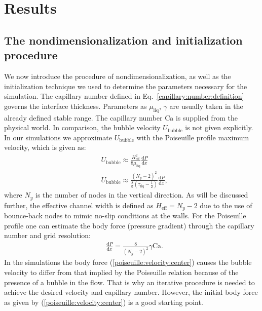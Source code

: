 \documentclass[preprint,12pt]{elsarticle}
\newcommand{\Ca}{\mathrm{Ca}}
\begin{document}
\section{Results}
\subsection{The nondimensionalization and initialization procedure}
\label{section:init}
We now introduce the procedure of nondimensionalization, as well as
the initialization technique we used to determine the parameters necessary for
the simulation. The capillary number defined in Eq.~\ref{capillary:number:definition} governs the
interface thickness.
{\color{red} Parameters as $\mu_{\mathrm{liq}}$, $\gamma$ are usually taken in the already defined
stable range. The capillary number $\Ca$ is supplied from the physical world.} 
In comparison, the bubble
velocity $U_{\mathrm{bubble}}$ is not given
explicitly.
In our simulations we approximate $U_{\mathrm{bubble}}$ with the
Poiseuille profile maximum velocity, which is given as:
\begin{equation}
\begin{aligned}
&U_{\mathrm{bubble}} \approx \frac{H_{\mathrm{eff}}^2}{8
\mu_{\mathrm{liq}}}\frac{\mathrm{d}P}{\mathrm{d}x}\\
&U_{\mathrm{bubble}}\approx
\frac{{(N_y-2)}^2}{\frac{8}{6}(\tau_{\mathrm{liq}}-\frac{1}{2})}\frac{\mathrm{d}P}{\mathrm{d}
x } ,
\end{aligned}
\end{equation}
where $N_y$ is the number of nodes in the vertical direction. As will be discussed further, the
effective channel width is defined as $H_{\mathrm{eff}}=N_y-2$ due to the use of bounce-back nodes to
mimic no-slip conditions at the walls.
For the Poiseuille profile one can estimate the body force (pressure gradient) through the
capillary number and grid resolution:
\begin{equation}
\label{poiseuille:velocity:center}
\begin{aligned}
&\frac{\mathrm{d}P}{\mathrm{d}x}=\frac{8}{{(N_y-2)}^2}\gamma \Ca.
\end{aligned}
\end{equation}
In the simulations the body force (\ref{poiseuille:velocity:center}) causes the bubble
velocity to differ from that implied by the Poiseuille relation because of the presence of a bubble in the
flow. That is
why an iterative procedure is needed to achieve the 
desired velocity and 
capillary number. 
However, the initial body force as given by (\ref{poiseuille:velocity:center}) is a good
starting point. 
\end{document}
